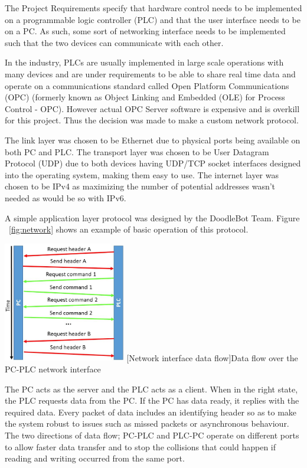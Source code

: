 The Project Requirements specify that hardware control needs to be implemented on a programmable logic controller (PLC) and that the user interface needs to be on a PC. As such, some sort of networking interface needs to be implemented such that the two devices can communicate with each other. 

In the industry, PLCs are usually implemented in large scale operations with many devices and are under requirements to be able to share real time data and operate on a communications standard called Open Platform Communications (OPC) (formerly known as Object Linking and Embedded (OLE) for Process Control - OPC). However actual OPC Server software is expensive and is overkill for this project. Thus the decision was made to make a custom network protocol.

The link layer was chosen to be Ethernet due to physical ports being available on both PC and PLC. The transport layer was chosen to be User Datagram Protocol (UDP) due to both devices having UDP/TCP socket interfaces designed into the operating system, making them easy to use. The internet layer was chosen to be IPv4 as maximizing the number of potential addresses wasn't needed as would be so with IPv6.

A simple application layer protocol was designed by the DoodleBot Team. Figure ~\ref{fig:network} shows an example of basic operation of this protocol. 

\begin{center}
	\includegraphics[width=0.4\textwidth]{figures/systemDesign/network.JPG}
	[Network interface data flow]{Data flow over the PC-PLC network interface}
	\label{fig:network}
\end{center}


The PC acts as the server and the PLC acts as a client. When in the right state, the PLC requests data from the PC. If the PC has data ready, it replies with the required data. Every packet of data includes an identifying header so as to make the system robust to issues such as missed packets or asynchronous behaviour. The two directions of data flow; PC-PLC and PLC-PC operate on different ports to allow faster data transfer and to stop the collisions that could happen if reading and writing occurred from the same port.

